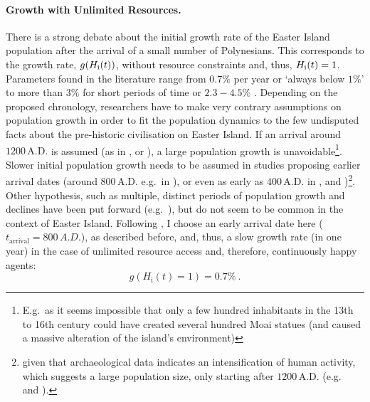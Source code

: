 \paragraph{Growth with Unlimited Resources.}
There is a strong debate about the initial growth rate of the Easter Island population after the arrival of a small number of Polynesians.
This corresponds to the growth rate, $g(H_{\rm i}(t))$, without resource constraints and, thus, $H_{\rm i}(t)=1$.
Parameters found in the literature range from $0.7\%$ per year \citep{Bahn2017} or `always below $1\%$' \citep{Brander1998} to more than $3\%$ \citep{Hunt2007} for short periods of time or $2.3-4.5\%$ \citep{Brandt2015}.
Depending on the proposed chronology, researchers have to make very contrary assumptions on population growth in order to fit the population dynamics to the few undisputed facts about the pre-historic civilisation on Easter Island. 
If an arrival around $1200\, \text{A.D.}$ is assumed (as in , or ), a large population growth is unavoidable\footnote{E.g.\ as it seems impossible that only a few hundred inhabitants in the 13th to 16th century could have created several hundred Moai statues (and caused a massive alteration of the island's environment)}.
Slower initial population growth needs to be assumed in studies proposing earlier arrival dates (around $800\, \text{A.D.}$ e.g.\ in ), or even as early as $400\, \text{A.D.}$ in , and )\footnote{given that archaeological data indicates an intensification of human activity, which suggests a large population size, only starting after $1200\, \text{A.D.}$ (e.g.\  and ).}.
Other hypothesis, such as multiple, distinct periods of population growth and declines have been put forward (e.g.\ ), but do not seem to be common in the context of Easter Island.
Following \citet{Bahn2017}, I choose an early arrival date here ($t_\text{arrival}=800\, A.D.$), as described before, and, thus, a slow growth rate (in one year) in the case of unlimited resource access and, therefore, continuously happy agents: 
\begin{equation}
	g(H_\text{i}(t)=1) = 0.7\% \ .
\end{equation}


